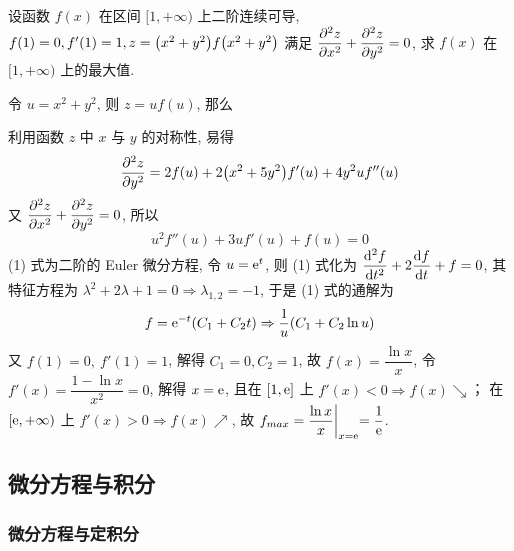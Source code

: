 \begin{example}
    设函数 $f(x)$ 在区间 $[1,+\infty)$ 上二阶连续可导, $f(1)=0,f'(1)=1,z=\qty(x^2+y^2)f\qty(x^2+y^2)$
    满足 $\displaystyle \pdv[2]{z}{x}+\pdv[2]{z}{y}=0$, 求 $f(x)$ 在 $[1,+\infty)$ 上的最大值.
\end{example}
\begin{solution}
    令 $u=x^2+y^2$, 则 $z=uf(u)$, 那么
    利用函数 $z$ 中 $x$ 与 $y$ 的对称性, 易得
    $$\pdv[2]{z}{y}=2f(u)+2\qty(x^2+5y^2)f'(u)+4y^2uf''(u)$$
    又 $\displaystyle \pdv[2]{z}{x}+\pdv[2]{z}{y}=0$, 所以
    \begin{equation*}
        u^2f''(u)+3uf'(u)+f(u)=0
        \tag{1}
    \end{equation*}
    (1) 式为二阶的 Euler 微分方程, 令 $u=\mathrm{e} ^t$, 则
    (1) 式化为 $\displaystyle \dv[2]{f}{t}+2\dv{f}{t}+f=0$, 其特征方程为 $\lambda^2+2\lambda+1=0\Rightarrow \lambda_{1,2}=-1$, 于是 (1) 式的通解为
    $$f=\mathrm{e} ^{-t}(C_1+C_2t)\Rightarrow \dfrac{1}{u}(C_1+C_2\ln u)$$
    又 $f(1)=0,~f'(1)=1$, 解得 $C_1=0,C_2=1$, 故 $f(x)=\dfrac{\ln x}{x}$, 令 $f'(x)=\dfrac{1-\ln x}{x^2}=0$, 解得 $x=\mathrm{e} $, 且在 $[1,\mathrm{e} ]$ 上 $f'(x)<0\Rightarrow f(x)\searrow$；
    在 $[\mathrm{e} ,+\infty)$ 上 $f'(x)>0\Rightarrow f(x)\nearrow$, 故 $f_{max}=\dfrac{\ln x}{x}\biggl |_{x=\mathrm{e} }=\dfrac{1}{\mathrm{e} }$.
\end{solution}

\subsection{微分方程与积分}

\subsubsection{微分方程与定积分}

